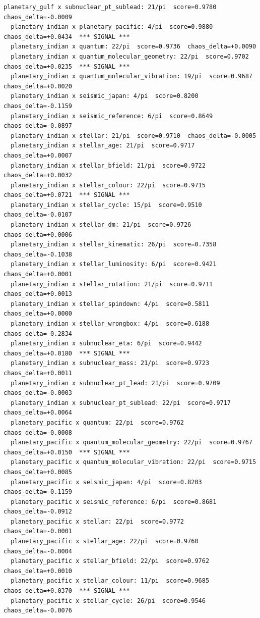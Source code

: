 \documentclass[11pt, letterpaper, openany]{book}
\begin{document}
\begin{empiricalbox}
\begin{lstlisting}[style=terminal]
  planetary_gulf x subnuclear_pt_sublead: 21/pi  score=0.9780  chaos_delta=-0.0009
  planetary_indian x planetary_pacific: 4/pi  score=0.9880  chaos_delta=+0.0434  *** SIGNAL ***
  planetary_indian x quantum: 22/pi  score=0.9736  chaos_delta=+0.0090
  planetary_indian x quantum_molecular_geometry: 22/pi  score=0.9702  chaos_delta=+0.0235  *** SIGNAL ***
  planetary_indian x quantum_molecular_vibration: 19/pi  score=0.9687  chaos_delta=+0.0020
  planetary_indian x seismic_japan: 4/pi  score=0.8200  chaos_delta=-0.1159
  planetary_indian x seismic_reference: 6/pi  score=0.8649  chaos_delta=-0.0897
  planetary_indian x stellar: 21/pi  score=0.9710  chaos_delta=-0.0005
  planetary_indian x stellar_age: 21/pi  score=0.9717  chaos_delta=+0.0007
  planetary_indian x stellar_bfield: 21/pi  score=0.9722  chaos_delta=+0.0032
  planetary_indian x stellar_colour: 22/pi  score=0.9715  chaos_delta=+0.0721  *** SIGNAL ***
  planetary_indian x stellar_cycle: 15/pi  score=0.9510  chaos_delta=-0.0107
  planetary_indian x stellar_dm: 21/pi  score=0.9726  chaos_delta=+0.0006
  planetary_indian x stellar_kinematic: 26/pi  score=0.7358  chaos_delta=-0.1038
  planetary_indian x stellar_luminosity: 6/pi  score=0.9421  chaos_delta=+0.0001
  planetary_indian x stellar_rotation: 21/pi  score=0.9711  chaos_delta=+0.0013
  planetary_indian x stellar_spindown: 4/pi  score=0.5811  chaos_delta=+0.0000
  planetary_indian x stellar_wrongbox: 4/pi  score=0.6188  chaos_delta=-0.2834
  planetary_indian x subnuclear_eta: 6/pi  score=0.9442  chaos_delta=+0.0180  *** SIGNAL ***
  planetary_indian x subnuclear_mass: 21/pi  score=0.9723  chaos_delta=+0.0011
  planetary_indian x subnuclear_pt_lead: 21/pi  score=0.9709  chaos_delta=-0.0003
  planetary_indian x subnuclear_pt_sublead: 22/pi  score=0.9717  chaos_delta=+0.0064
  planetary_pacific x quantum: 22/pi  score=0.9762  chaos_delta=-0.0008
  planetary_pacific x quantum_molecular_geometry: 22/pi  score=0.9767  chaos_delta=+0.0150  *** SIGNAL ***
  planetary_pacific x quantum_molecular_vibration: 22/pi  score=0.9715  chaos_delta=+0.0085
  planetary_pacific x seismic_japan: 4/pi  score=0.8203  chaos_delta=-0.1159
  planetary_pacific x seismic_reference: 6/pi  score=0.8681  chaos_delta=-0.0912
  planetary_pacific x stellar: 22/pi  score=0.9772  chaos_delta=-0.0001
  planetary_pacific x stellar_age: 22/pi  score=0.9760  chaos_delta=-0.0004
  planetary_pacific x stellar_bfield: 22/pi  score=0.9762  chaos_delta=+0.0010
  planetary_pacific x stellar_colour: 11/pi  score=0.9685  chaos_delta=+0.0370  *** SIGNAL ***
  planetary_pacific x stellar_cycle: 26/pi  score=0.9546  chaos_delta=-0.0076

\end{lstlisting}
\end{empiricalbox}
\end{document}
